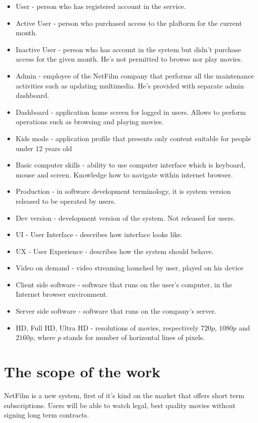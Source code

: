\documentclass{scrreprt}
\begin{document}
\begin{itemize}
\item User - person who has registered account in the service.
\item Active User - person who purchased access to the plaftorm for the current month.
\item Inactive User - person who has account in the system but didn't purchase access for the given month. He's not permitted to browse nor play movies.
\item Admin - employee of the NetFilm company that performs all the maintenance activities such as updating multimedia. He's provided with separate admin dashboard.
\item Dashboard - application home screen for logged in users. Allows to perform operations such as browsing and playing movies.
\item Kids mode - application profile that presents only content suitable for people under 12 years old
\item Basic computer skills - ability to use computer interface which is keyboard, mouse and screen. Knowledge how to navigate within internet browser.
\item Production - in software development terminology, it is system version released to be operated by users.
\item Dev version - development version of the system. Not released for users.
\item UI - User Interface - describes how interface looks like.
\item UX - User Experience - describes how the system should behave.
\item Video on demand - video streaming launched by user, played on his device
\item Client side software - software that runs on the user's computer, in the Internet browser environment.
\item Server side software - software that runs on the company's server.
\item HD, Full HD, Ultra HD - resolutions of movies, respectively $720p$, $1080p$ and $2160p$, where $p$ stands for number of horizontal lines of pixels.
\end{itemize}

\section{The scope of the work}

NetFilm is a new system, first of it's kind on the market that offers short term subscriptions. Users will be able to watch legal, best quality movies without signing long term contracts.
\end{document}
